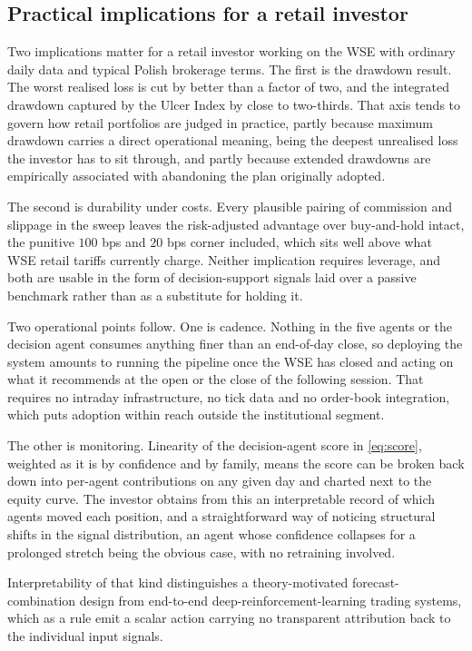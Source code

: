 \subsection{Practical implications for a retail investor}\label{subsec:practical}

Two implications matter for a retail investor working on the WSE with ordinary daily data and typical Polish brokerage terms. The first is the drawdown result. The worst realised loss is cut by better than a factor of two, and the integrated drawdown captured by the Ulcer Index by close to two-thirds. That axis tends to govern how retail portfolios are judged in practice, partly because maximum drawdown carries a direct operational meaning, being the deepest unrealised loss the investor has to sit through, and partly because extended drawdowns are empirically associated with abandoning the plan originally adopted.

The second is durability under costs. Every plausible pairing of commission and slippage in the sweep leaves the risk-adjusted advantage over buy-and-hold intact, the punitive $100$ bps and $20$ bps corner included, which sits well above what WSE retail tariffs currently charge. Neither implication requires leverage, and both are usable in the form of decision-support signals laid over a passive benchmark rather than as a substitute for holding it.

Two operational points follow. One is cadence. Nothing in the five agents or the decision agent consumes anything finer than an end-of-day close, so deploying the system amounts to running the pipeline once the WSE has closed and acting on what it recommends at the open or the close of the following session. That requires no intraday infrastructure, no tick data and no order-book integration, which puts adoption within reach outside the institutional segment.

The other is monitoring. Linearity of the decision-agent score in \eqref{eq:score}, weighted as it is by confidence and by family, means the score can be broken back down into per-agent contributions on any given day and charted next to the equity curve. The investor obtains from this an interpretable record of which agents moved each position, and a straightforward way of noticing structural shifts in the signal distribution, an agent whose confidence collapses for a prolonged stretch being the obvious case, with no retraining involved.

Interpretability of that kind distinguishes a theory-motivated forecast-combination design from end-to-end deep-reinforcement-learning trading systems, which as a rule emit a scalar action carrying no transparent attribution back to the individual input signals.


